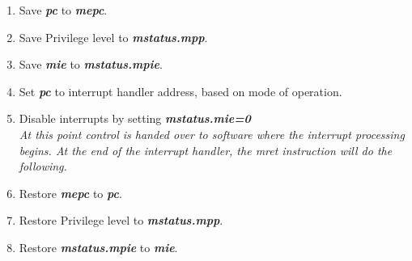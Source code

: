 \documentclass[../main.tex]{subfiles}
\begin{document}
\begin{enumerate}
    \item Save \textbf{\textit{pc}} to \textbf{\textit{mepc}}.
    \item Save Privilege level to \textbf{\textit{mstatus.mpp}}.
    \item Save \textbf{\textit{mie}} to \textbf{\textit{mstatus.mpie}}.
    \item Set \textbf{\textit{pc}} to interrupt handler address, based on mode of operation.
    \item Disable interrupts by setting \textbf{\textit{mstatus.mie=0}}\\
    \textit{At this point control is handed over to software where the interrupt processing begins. At the end of the interrupt handler, the mret instruction will do the following.}
    \item Restore \textbf{\textit{mepc}} to \textbf{\textit{pc}}.
    \item Restore Privilege level to \textbf{\textit{mstatus.mpp}}.
    \item Restore \textbf{\textit{mstatus.mpie}} to \textbf{\textit{mie}}.
\end{enumerate}
\end{document}
